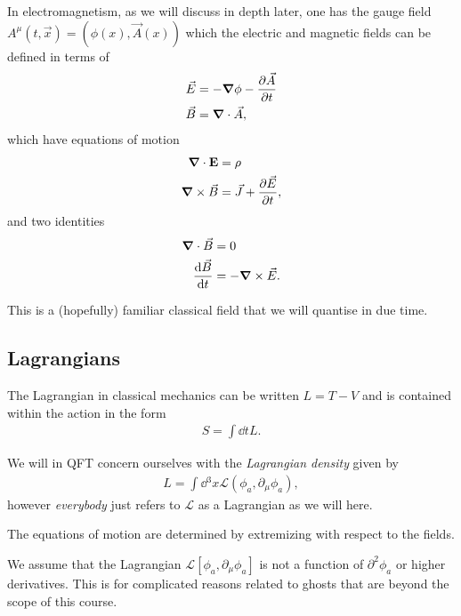 \begin{example}
    In electromagnetism, as we will discuss in depth later, one has the gauge field $A^{\mu} \left( t, \vec{x} \right) = \left( \phi \left( x \right) , \vec{A}\left( x \right)  \right) $ which the electric and magnetic fields can be defined in terms of
    \begin{align}
        \vec{E} &= - \grad \phi - \pdv{\vec{A}}{t} \\
        \vec{B} &= \grad \cdot \vec{A}
    ,\end{align}
    which have equations of motion
    \begin{align}
        \grad \cdot \vb{E} &= \rho  \\
        \grad \times  \vec{B} &= \vec{J} + \pdv{\vec{E}}{t}
    ,\end{align}
    and two identities
\begin{align}
    \grad \cdot \vec{B} &= 0 \\
    \dv{\vec{B}}{t} &= - \grad \times \vec{E}
.\end{align}

This is a (hopefully) familiar classical field that we will quantise in due time.
\end{example}


\subsection{Lagrangians}

The Lagrangian in classical mechanics can be written $L = T - V$ and is contained within the action in the form
\begin{align}
    S = \int \dd{t} L
.\end{align}

We will in QFT concern ourselves with the \textit{Lagrangian density} given by
\begin{align}
    L = \int \dd{^3x} \mathcal{L} \left( \phi_a , \partial_\mu \phi_a \right) 
,\end{align}
however \textit{everybody} just refers to $\mathcal{L}$ as a Lagrangian as we will here.

The equations of motion are determined by extremizing with respect to the fields. 

\begin{note}
    We assume that the Lagrangian $\mathcal{L}\left[ \phi_a, \partial_\mu \phi_a \right] $ is not a function of $\partial^2 \phi_a$ or higher derivatives. This is for complicated reasons related to ghosts that are beyond the scope of this course.
\end{note}

